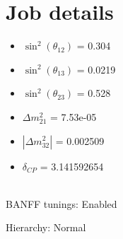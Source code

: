 \documentclass[10pt,a4paper]{article}
\begin{document}
\section*{Job details}


\begin{minipage}[t]{0.5\textwidth}
\begin{itemize}
\item[] $\sin^2(\theta_{12})$ = 0.304
\item[] $\sin^2(\theta_{13})$ = 0.0219
\item[] $\sin^2(\theta_{23})$ = 0.528
\item[] $\Delta m^2_{21}$ = 7.53e-05
\item[] $|\Delta m^2_{32}|$ = 0.002509
\item[] $\delta_{CP}$ = 3.141592654
\end{itemize}
\end{minipage}
\\



BANFF tunings: Enabled

Hierarchy: Normal
\end{document}
